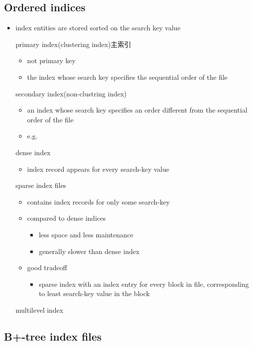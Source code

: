 \documentclass[11pt]{article}
\begin{document}
\subsection{Ordered indices}
\label{sec-16-2}
\begin{itemize}
\item index entities are stored sorted on the search key value
\item[{primary index(clustering index)主索引}] \begin{itemize}
\item not primary key
\item the index whose search key specifies the sequential order of the file
\end{itemize}
\item[{secondary index(non-clustring index)}] \begin{itemize}
\item an index whose search key specifies an order different from
the sequential order of the file
\item e.g.
\end{itemize}
\item[{dense index}] \begin{itemize}
\item index record appears for every search-key value
\end{itemize}
\item[{sparse index files}] \begin{itemize}
\item contains index records for only some search-key
\item compared to dense indices
\begin{itemize}
\item less space and less maintenance
\item generally slower than dense index
\end{itemize}
\item good tradeoff
\begin{itemize}
\item sparse index with an index entry for every block in file, corresponding
to least search-key value in the block
\end{itemize}
\end{itemize}
\item[{multilevel index}] 
\end{itemize}
\subsection{B+-tree index files}
\label{sec-16-3}
\end{document}
